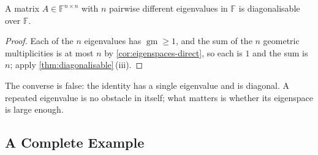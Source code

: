 \begin{corollary}
\label{cor:distinct-diagonalisable}
A matrix $A\in\mathbb F^{n\times n}$ with $n$ pairwise different eigenvalues in $\mathbb F$ is diagonalisable over $\mathbb F$.
\end{corollary}

\begin{proof}
Each of the $n$ eigenvalues has $\operatorname{gm}\ge1$, and the sum of the $n$ geometric multiplicities is at most $n$ by \cref{cor:eigenspaces-direct}, so each is $1$ and the sum is $n$; apply \cref{thm:diagonalisable}\,(iii).
\end{proof}

The converse is false: the identity has a single eigenvalue and is diagonal. A repeated eigenvalue is no obstacle in itself; what matters is whether its eigenspace is large enough.

\subsection{A Complete Example}

